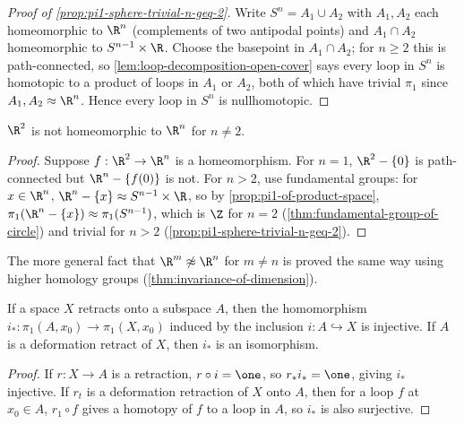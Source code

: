 \begin{proof}[Proof of \cref{prop:pi1-sphere-trivial-n-geq-2}]
Write $S^n = A_1 \cup A_2$ with $A_1,A_2$ each homeomorphic to $\R^n$ (complements of
two antipodal points) and $A_1\cap A_2$ homeomorphic to $S^{n-1}\times\R$. Choose the
basepoint in $A_1\cap A_2$; for $n\ge 2$ this is path-connected, so
\cref{lem:loop-decomposition-open-cover} says every loop in $S^n$ is homotopic to a product of
loops in $A_1$ or $A_2$, both of which have trivial $\pi_1$ since $A_1,A_2 \approx \R^n$. Hence
every loop in $S^n$ is nullhomotopic.
\end{proof}

\begin{corollary}
\label{cor:r2-not-homeomorphic-rn}
$\R^2$ is not homeomorphic to $\R^n$ for $n \ne 2$.
\end{corollary}

\begin{proof}
Suppose $f : \R^2 \to \R^n$ is a homeomorphism. For $n=1$, $\R^2-\{0\}$ is
path-connected but $\R^n-\{f(0)\}$ is not. For $n>2$, use fundamental groups: for
$x\in\R^n$, $\R^n-\{x\} \approx S^{n-1}\times\R$, so by \cref{prop:pi1-of-product-space},
$\pi_1(\R^n-\{x\}) \approx \pi_1(S^{n-1})$, which is $\Z$ for $n=2$ (\cref{thm:fundamental-group-of-circle})
and trivial for $n>2$ (\cref{prop:pi1-sphere-trivial-n-geq-2}).
\end{proof}

The more general fact that $\R^m \not\approx \R^n$ for $m \ne n$ is proved the same way
using higher homology groups (\cref{thm:invariance-of-dimension}).

\begin{proposition}
\label{prop:retract-induces-injective-pi1}
If a space $X$ retracts onto a subspace $A$, then the homomorphism
$i_* : \pi_1(A,x_0) \to \pi_1(X,x_0)$ induced by the inclusion $i : A \hookrightarrow X$ is injective.
If $A$ is a deformation retract of $X$, then $i_*$ is an isomorphism.
\end{proposition}

\begin{proof}
If $r : X \to A$ is a retraction, $r\circ i = \one$, so $r_*i_* = \one$, giving $i_*$ injective. If
$r_t$ is a deformation retraction of $X$ onto $A$, then for a loop $f$ at $x_0 \in A$,
$r_1 \circ f$ gives a homotopy of $f$ to a loop in $A$, so $i_*$ is also surjective.
\end{proof}


